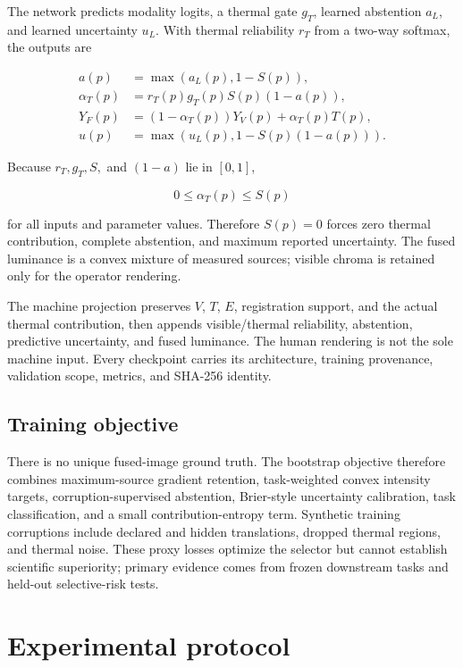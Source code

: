 \documentclass[10pt]{article}
\begin{document}
The network predicts modality logits, a thermal gate $g_T$, learned abstention
$a_L$, and learned uncertainty $u_L$. With thermal reliability $r_T$ from a
two-way softmax, the outputs are

\begin{align}
  a(p) &= \max(a_L(p),1-S(p)),\\
  \alpha_T(p) &= r_T(p)g_T(p)S(p)(1-a(p)),\\
  Y_F(p) &= (1-\alpha_T(p))Y_V(p)+\alpha_T(p)T(p),\\
  u(p) &= \max(u_L(p),1-S(p)(1-a(p))).
\end{align}

Because $r_T,g_T,S,$ and $(1-a)$ lie in $[0,1]$,

\begin{equation}
  0\leq\alpha_T(p)\leq S(p)
\end{equation}

for all inputs and parameter values. Therefore $S(p)=0$ forces zero thermal
contribution, complete abstention, and maximum reported uncertainty. The fused
luminance is a convex mixture of measured sources; visible chroma is retained
only for the operator rendering.

The machine projection preserves $V$, $T$, $E$, registration support, and the
actual thermal contribution, then appends visible/thermal reliability,
abstention, predictive uncertainty, and fused luminance. The human rendering
is not the sole machine input. Every checkpoint carries its architecture,
training provenance, validation scope, metrics, and SHA-256 identity.

\subsection{Training objective}

There is no unique fused-image ground truth. The bootstrap objective therefore
combines maximum-source gradient retention, task-weighted convex intensity
targets, corruption-supervised abstention, Brier-style uncertainty calibration,
task classification, and a small contribution-entropy term. Synthetic training
corruptions include declared and hidden translations, dropped thermal regions,
and thermal noise. These proxy losses optimize the selector but cannot establish
scientific superiority; primary evidence comes from frozen downstream tasks and
held-out selective-risk tests.

\section{Experimental protocol}
\end{document}
